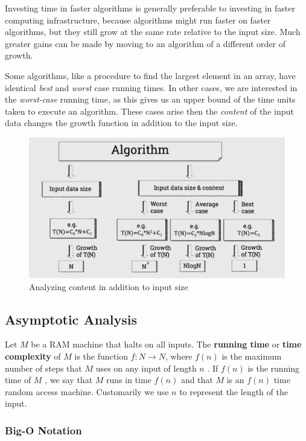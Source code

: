 Investing time in faster algorithms is generally preferable to investing in faster computing infrastructure, because algorithms might run faster on faster algorithms, but they still grow at the same rate relative to the input size. Much greater gains can be made by moving to an algorithm of a different order of growth.

Some algorithms, like a procedure to find the largest element in an array, have identical \emph{best} and \emph{worst} case running times. In other cases, we are interested in the \emph{worst-case} running time, as this gives us an upper bound of the time units taken to execute an algorithm. These cases arise then the \emph{content} of the input data changes the growth function in addition to the input size.

\begin{figure}[H]
    \centering
    \includegraphics[width=\textwidth]{inputsize.png}
    \caption{Analyzing content in addition to input size}
    \label{fig:inputsize}
\end{figure}

\subsection{Asymptotic Analysis}

Let \( M \) be a RAM machine that halts on all inputs. The \textbf{running time} or \textbf{time complexity} of \( M \) is the function \( f: N \rightarrow N \), where \( f(n) \) is the maximum number of steps that \( M \) uses on any input of length \( n \) . If \( f(n) \) is the running time of \( M \) , we say that \( M \) runs in time \( f(n) \) and that \( M \) is an \( f(n) \) time random access machine. Customarily we use \( n \) to represent the length of the input.

\subsubsection{Big-O Notation}

